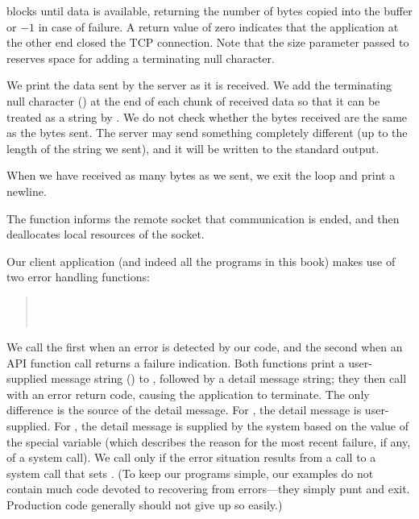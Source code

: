 \begin{topcode}
\begin{bottomcode}


 blocks until data is available, returning the
number of bytes copied into the buffer or $-1$ in case of failure.  A
return value of zero indicates that the application at the other end
closed the TCP connection.  Note that the size parameter passed to
 reserves space for adding a terminating null character.


We print the data sent by the server as it is received.  We add the
terminating null character (\termchar) at the end of each chunk of
received data so that it can be treated as a string by
.  We do not check whether the bytes received are the
same as the bytes sent. The server may send something completely
different (up to the length of the string we sent), and it will be
written to the standard output.


When we have received as many bytes as we sent, we exit the loop and
print a newline.

\end{bottomcode}


The  function informs the remote socket that
communication is ended, and then deallocates local resources
of the socket.

\end{topcode}

Our client application (and indeed all the programs in this book)
makes use of two error handling functions:
\begin{quote}
 \\
 \\
\end{quote}
We call the first when an error is detected by our code, and the
second when an API function call returns a failure indication.
Both functions print a user-supplied message string () to
, followed by a detail message string; they then
call  with an error return code, causing the
application to terminate.
%
The only difference is the source of the detail message.  For
, the detail message is user-supplied.  For
,
the detail message is supplied by the system based on the
value of the special variable   (which describes the reason for
the most recent failure, if any, of a system call).  We call 
 only if the error situation results from a
call to a system call that sets .
%
(To keep our programs simple, our examples do not contain much code
devoted to recovering from errors---they simply punt and exit.
Production code generally should not give up so easily.)

